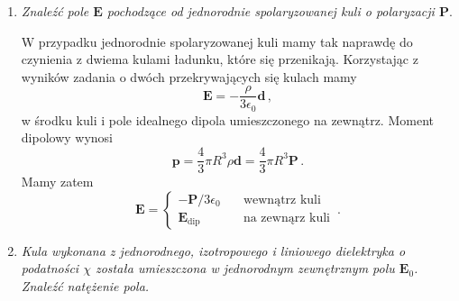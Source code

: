 \documentclass[../main.tex]{subfiles}
\begin{document}
\begin{enumerate}
    \item \textit{Znaleźć pole \(\mathbf{E}\) pochodzące od jednorodnie spolaryzowanej kuli o polaryzacji \(\mathbf{P}\)}.
\medskip

\noindent W przypadku jednorodnie spolaryzowanej kuli mamy tak naprawdę do czynienia z dwiema kulami ładunku, które się przenikają. Korzystając z wyników zadania o dwóch przekrywających się kulach mamy
\begin{equation*}
    \mathbf{E}=-\frac{\rho}{3\epsilon_0}\mathbf{d}\,,
\end{equation*}
w środku kuli i pole idealnego dipola umieszczonego na zewnątrz. Moment dipolowy wynosi
\begin{equation*}
    \mathbf{p}=\frac{4}{3}\pi R^3\rho\mathbf{d}=\frac{4}{3}\pi R^3\mathbf{P}\,.
\end{equation*}
Mamy zatem
\begin{equation*}
    \mathbf{E}=\begin{cases} -\mathbf{P}/3\epsilon_0&\quad\text{wewnątrz kuli}\\ \mathbf{E}_\text{dip}&\quad\text{na zewnąrz kuli}\end{cases}\,.
\end{equation*}

\item \textit{Kula wykonana z jednorodnego, izotropowego i liniowego dielektryka o podatności \(\chi\) została umieszczona w jednorodnym zewnętrznym polu \(\mathbf{E}_0\). Znaleźć natężenie pola.}
\medskip


\end{enumerate}
\end{document}
